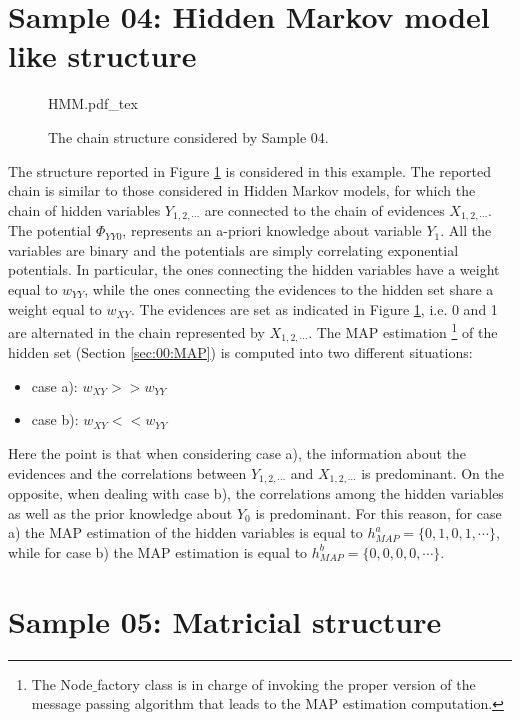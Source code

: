 
\section{Sample 04: Hidden Markov model like structure}

\begin{figure}
	\centering
\def\svgwidth{0.8 \textwidth}
{HMM.pdf_tex} 
\caption{The chain structure considered by Sample 04.}
\label{fig:sample_04:0}
\end{figure}

The structure reported in Figure \ref{fig:sample_04:0} is considered in this example.
The reported chain is similar to those considered in Hidden Markov models, for which the chain of hidden variables $Y_{1,2,\cdots}$ are connected to the chain of evidences $X_{1,2,\cdots}$. The potential $\Phi_{YY0}$, represents an a-priori knowledge about variable $Y_1$. All the variables are binary and the potentials are simply correlating exponential potentials. In particular, the ones connecting the hidden variables have a weight equal to $w_{YY}$, while the ones connecting the evidences to the hidden set share a weight equal to $w_{XY}$.
The evidences are set as indicated in Figure \ref{fig:sample_04:0}, i.e. 0 and 1 are alternated in the chain represented by $X_{1,2,\cdots}$.
The MAP estimation \footnote{The Node$\_$factory class is in charge of invoking the proper version of the message passing algorithm that leads to the MAP estimation computation.} of the hidden set (Section \ref{sec:00:MAP}) is computed into two different situations:
\begin{itemize}
\item case a): $w_{XY} >> w_{YY}$
\item case b): $w_{XY} << w_{YY}$
\end{itemize}
Here the point is that when considering case a), the information about the evidences and the correlations between $Y_{1,2,\cdots}$ and $X_{1,2,\cdots}$ is predominant. On the opposite, when dealing with case b), the correlations among the hidden variables as well as the prior knowledge about $Y_0$ is predominant. For this reason, for case a) the MAP estimation of the hidden variables is equal to $h_{MAP}^a = \lbrace 0,1,0,1, \cdots  \rbrace$,
while for case b) the MAP estimation is equal to $h_{MAP}^b = \lbrace 0,0,0,0, \cdots  \rbrace$.

\section{Sample 05: Matricial structure}

